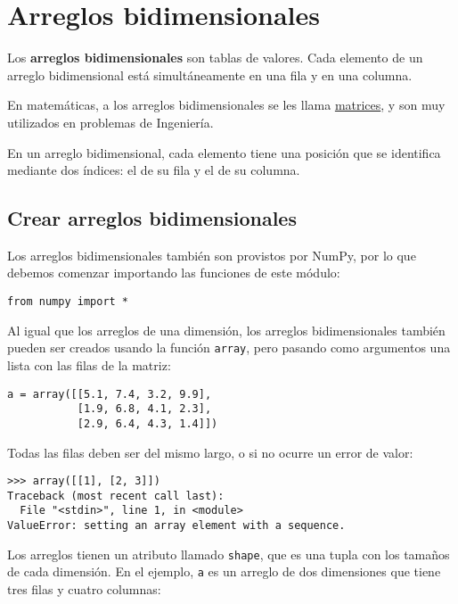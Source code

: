 \section{Arreglos bidimensionales}

Los \textbf{arreglos bidimensionales} son tablas de valores. Cada
elemento de un arreglo bidimensional está simultáneamente en una fila y
en una columna.

En matemáticas, a los arreglos bidimensionales se les llama
\href{http://es.wikipedia.org/wiki/Matriz\_(matem\%C3\%A1tica)}{matrices},
y son muy utilizados en problemas de Ingeniería.

En un arreglo bidimensional, cada elemento tiene una posición que se
identifica mediante dos índices: el de su fila y el de su columna.

\subsection{Crear arreglos bidimensionales}

Los arreglos bidimensionales también son provistos por NumPy, por lo que
debemos comenzar importando las funciones de este módulo:

\begin{lstlisting}
from numpy import *
\end{lstlisting}

Al igual que los arreglos de una dimensión, los arreglos bidimensionales
también pueden ser creados usando la función \lstinline!array!, pero
pasando como argumentos una lista con las filas de la matriz:

\begin{lstlisting}
a = array([[5.1, 7.4, 3.2, 9.9],
           [1.9, 6.8, 4.1, 2.3],
           [2.9, 6.4, 4.3, 1.4]])
\end{lstlisting}

Todas las filas deben ser del mismo largo, o si no ocurre un error de
valor:

\begin{lstlisting}
>>> array([[1], [2, 3]])
Traceback (most recent call last):
  File "<stdin>", line 1, in <module>
ValueError: setting an array element with a sequence.
\end{lstlisting}

Los arreglos tienen un atributo llamado \lstinline!shape!, que es una
tupla con los tamaños de cada dimensión. En el ejemplo, \lstinline!a! es
un arreglo de dos dimensiones que tiene tres filas y cuatro columnas:

